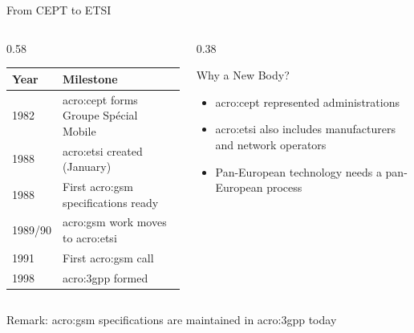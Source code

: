 \begin{frame}{From CEPT to ETSI}
  \begin{columns}[T,onlytextwidth]
    \begin{column}{0.58\textwidth}
      \begin{tabular}{ll}
        \toprule
        \textbf{Year} & \textbf{Milestone}~\cite{hillebrand-gsm,etsi-history,3gpp-gsm-history} \\
        \midrule
        1982 & \acrshort{acro:cept} forms Groupe Spécial Mobile \\
        1988 & \Gls{acro:etsi} created (January) \\
        1988 & First \gls{acro:gsm} specifications ready \\
        1989/90 & \Gls{acro:gsm} work moves to \gls{acro:etsi} \\
        1991 & First \gls{acro:gsm} call \\
        1998 & \Gls{acro:3gpp} formed \\
        \bottomrule
      \end{tabular}
    \end{column}
    \begin{column}{0.38\textwidth}
      \begin{block}{Why a New Body?}
        \begin{itemize}
          \item \Gls{acro:cept} represented administrations
          \item \Gls{acro:etsi} also includes manufacturers and network operators
          \item Pan-European technology needs a pan-European process
        \end{itemize}
      \end{block}
    \end{column}
  \end{columns}
  \vspace{1em}
  \alert{Remark:} \Gls{acro:gsm} specifications are maintained in \gls{acro:3gpp} today
\end{frame}

